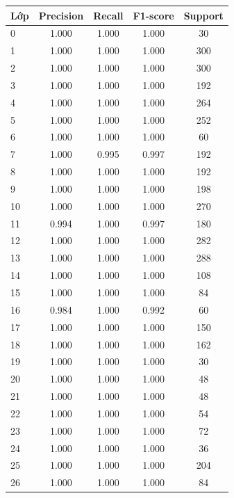 \documentclass[12pt,a4paper]{article}
\begin{document}
\begin{table}[H]
\centering
\footnotesize
\begin{tabular}{@{}lcccc@{}}
\toprule
\textbf{Lớp} & \textbf{Precision} & \textbf{Recall} & \textbf{F1-score} & \textbf{Support} \\ \midrule
\rowcolor{rowgray} 0  & 1.000 & 1.000 & 1.000 & 30 \\
1  & 1.000 & 1.000 & 1.000 & 300 \\
\rowcolor{rowgray} 2  & 1.000 & 1.000 & 1.000 & 300 \\
3  & 1.000 & 1.000 & 1.000 & 192 \\
\rowcolor{rowgray} 4  & 1.000 & 1.000 & 1.000 & 264 \\
5  & 1.000 & 1.000 & 1.000 & 252 \\
\rowcolor{rowgray} 6  & 1.000 & 1.000 & 1.000 & 60 \\
7  & 1.000 & 0.995 & 0.997 & 192 \\
\rowcolor{rowgray} 8  & 1.000 & 1.000 & 1.000 & 192 \\
9  & 1.000 & 1.000 & 1.000 & 198 \\
\rowcolor{rowgray} 10 & 1.000 & 1.000 & 1.000 & 270 \\
11 & 0.994 & 1.000 & 0.997 & 180 \\
\rowcolor{rowgray} 12 & 1.000 & 1.000 & 1.000 & 282 \\
13 & 1.000 & 1.000 & 1.000 & 288 \\
\rowcolor{rowgray} 14 & 1.000 & 1.000 & 1.000 & 108 \\
15 & 1.000 & 1.000 & 1.000 & 84 \\
\rowcolor{rowgray} 16 & 0.984 & 1.000 & 0.992 & 60 \\
17 & 1.000 & 1.000 & 1.000 & 150 \\
\rowcolor{rowgray} 18 & 1.000 & 1.000 & 1.000 & 162 \\
19 & 1.000 & 1.000 & 1.000 & 30 \\
\rowcolor{rowgray} 20 & 1.000 & 1.000 & 1.000 & 48 \\
21 & 1.000 & 1.000 & 1.000 & 48 \\
\rowcolor{rowgray} 22 & 1.000 & 1.000 & 1.000 & 54 \\
23 & 1.000 & 1.000 & 1.000 & 72 \\
\rowcolor{rowgray} 24 & 1.000 & 1.000 & 1.000 & 36 \\
25 & 1.000 & 1.000 & 1.000 & 204 \\
\rowcolor{rowgray} 26 & 1.000 & 1.000 & 1.000 & 84 \\

\end{tabular}
\end{table}
\end{document}
